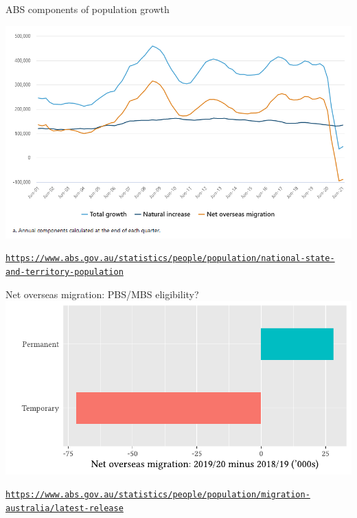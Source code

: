 \documentclass[aspectratio=169,12pt]{beamer} %
\begin{document}
\begin{frame}{ABS components of population growth}

	\center\includegraphics[height=0.75\textheight]{ref/pop-components.PNG}
	\begin{flushright}\tiny\texttt{\url{https://www.abs.gov.au/statistics/people/population/national-state-and-territory-population}}\end{flushright}
\end{frame}

\begin{frame}{Net overseas migration: PBS/MBS eligibility?}
	\center\includegraphics[height=0.75\textheight]{ref/pops-nom.pdf}
	\begin{flushright}\tiny\texttt{\url{https://www.abs.gov.au/statistics/people/population/migration-australia/latest-release}}\end{flushright}
\end{frame}
\end{document}
